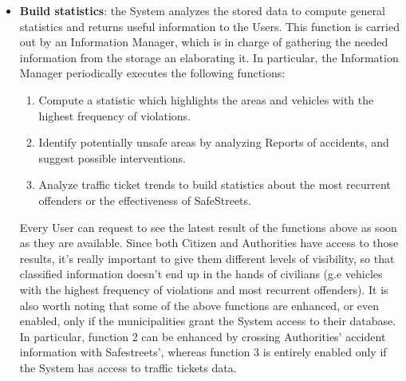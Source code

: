 \documentclass{report}
\begin{document}
\begin{itemize}
	\item \textbf{Build statistics}: the System analyzes the stored data to compute general statistics and returns useful information to the Users. This function is carried out by an Information Manager, which is in charge of gathering the needed information from the storage an elaborating it. In particular, the Information Manager periodically executes the following functions:
	\begin{enumerate}
		\item Compute a statistic which highlights the areas and vehicles with the highest frequency of violations.
		\item Identify potentially unsafe areas by analyzing Reports of accidents, and suggest possible interventions.
		\item Analyze traffic ticket trends to build statistics about the most recurrent offenders or the effectiveness of SafeStreets.
	\end{enumerate}
	Every User can request to see the latest result of the functions above as soon as they are available. Since both Citizen and Authorities have access to those results, it's really important to give them different levels of visibility, so that classified information doesn't end up in the hands of civilians (g.e vehicles with the highest frequency of violations and most recurrent offenders). It is also worth noting that some of the above functions are enhanced, or even enabled, only if the municipalities grant the System access to their database. In particular, function 2 can be enhanced by crossing Authorities' accident information with Safestreets', whereas function 3 is entirely enabled only if the System has access to traffic tickets data.

\end{itemize}
\newpage
\end{document}
